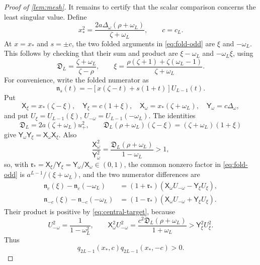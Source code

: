 \documentclass[review,hidelinks,onefignum,onetabnum]{siamart251216}
\begin{document}
\begin{proof}[Proof of \cref{lem:mesh}]
It remains to certify that the scalar comparison concerns the least
singular value.  Define
\begin{equation}\label{eq:x-star-central}
 x_*^2=\frac{2a\Delta_\omega(\rho+\omega_L)}{\zeta+\omega_L},
 \qquad c=c_L.
\end{equation}
At \(x=x_*\) and \(s=\pm c\), the two folded arguments in
\eqref{eq:fold-odd} are \(\xi\) and \(-\omega_L\).  This follows by
checking that their sum and product are \(\xi-\omega_L\) and
\(-\omega_L\xi\), using
\[
 \mathfrak D_L=\frac{\zeta+\omega_L}{\zeta-\rho},\qquad
 \xi=\frac{\rho(\zeta+1)+\zeta(\omega_L-1)}{\zeta+\omega_L}.
\]
For convenience, write the folded numerator as
\[
 \mathfrak n_s(t)=-[x(\zeta-t)+s(1+t)]U_{L-1}(t).
\]
Put
\[
 \mathsf{X}_\xi=x_*(\zeta-\xi),\quad
 \mathsf{Y}_\xi=c(1+\xi),\quad
 \mathsf{X}_\omega=x_*(\zeta+\omega_L),\quad
 \mathsf{Y}_\omega=c\Delta_\omega,
\]
and put
\(U_\xi=U_{L-1}(\xi)\),
\(U_{-\omega}=U_{L-1}(-\omega_L)\).  The identities
\[
 \mathfrak D_L=2a(\zeta+\omega_L)u_+^2,\qquad
 \mathfrak D_L(\rho+\omega_L)(\zeta-\xi)
 =(\zeta+\omega_L)(1+\xi)
\]
give
\(\mathsf{Y}_\omega\mathsf{Y}_\xi
=\mathsf{X}_\omega\mathsf{X}_\xi\).  Also
\[
 \frac{\mathsf{X}_\omega^2}{\mathsf{Y}_\omega^2}
 =\frac{\mathfrak D_L(\rho+\omega_L)}{1-\omega_L}>1,
\]
so, with
\(\mathfrak r_*=\mathsf{X}_\xi/\mathsf{Y}_\xi
=\mathsf{Y}_\omega/\mathsf{X}_\omega\in(0,1)\), the common nonzero factor
in \eqref{eq:fold-odd} is \(a^{L-1}/(\xi+\omega_L)\), and the two numerator
differences are
\[
\begin{aligned}
 \mathfrak n_c(\xi)-\mathfrak n_c(-\omega_L)
  &=(1+\mathfrak r_*)
    (\mathsf{X}_\omega U_{-\omega}-\mathsf{Y}_\xi U_\xi),\\
 \mathfrak n_{-c}(\xi)-\mathfrak n_{-c}(-\omega_L)
  &=(1-\mathfrak r_*)
    (\mathsf{X}_\omega U_{-\omega}+\mathsf{Y}_\xi U_\xi).
\end{aligned}
\]
Their product is positive by \eqref{eq:central-target}, because
\[
 U_{-\omega}^2=\frac1{1-\omega_L^2},\qquad
 \mathsf{X}_\omega^2U_{-\omega}^2
 =\frac{c^2\mathfrak D_L(\rho+\omega_L)}{1+\omega_L}
 >\mathsf{Y}_\xi^2U_\xi^2.
\]
Thus
\begin{equation}\label{eq:q-product-central}
 q_{2L-1}(x_*,c)q_{2L-1}(x_*,-c)>0.
\end{equation}


\end{proof}
\end{document}
